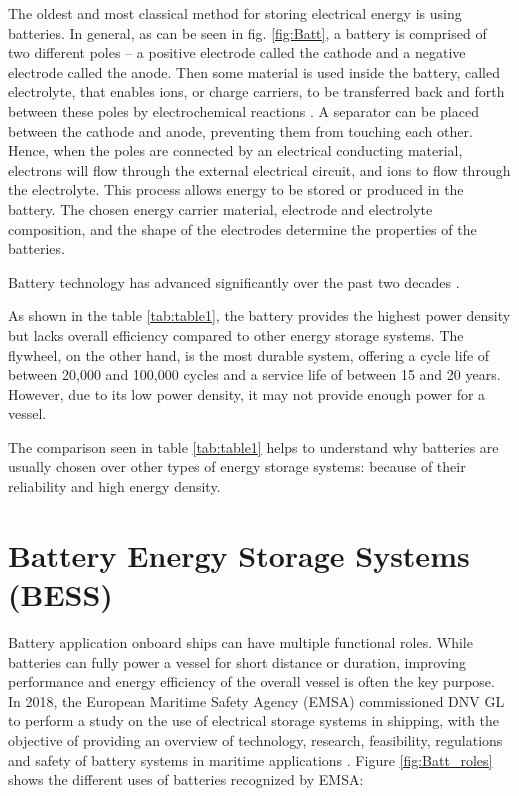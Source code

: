 The oldest and most classical method for storing electrical energy is using batteries. In general, as can be seen in fig. \ref{fig:Batt}, a battery is comprised of two different poles – a positive electrode called the cathode and a negative electrode called the anode. Then some material is used inside the battery, called electrolyte, that enables ions, or charge carriers, to be transferred back and forth between these poles by electrochemical reactions \cite{EMSA}. A separator can be placed between the cathode and anode, preventing them from touching each other. Hence, when the poles are connected by an electrical conducting material, electrons will flow through the external electrical circuit, and ions to flow through the electrolyte. This process allows energy to be stored or produced in the battery. The chosen energy carrier material, electrode and electrolyte composition, and the shape of the electrodes determine the properties of the batteries.

Battery technology has advanced significantly over the past two decades \cite{MAN}. 

As shown in the table \ref{tab:table1}, the battery provides the highest power density but lacks overall efficiency compared to other energy storage systems. The flywheel, on the other hand, is the most durable system, offering a cycle life of between 20,000 and 100,000 cycles and a service life of between 15 and 20 years. However, due to its low power density, it may not provide enough power for a vessel.

The comparison seen in table \ref{tab:table1} helps to understand why batteries are usually chosen over other types of energy storage systems: because of their reliability and high energy density.

\section{Battery Energy Storage Systems (BESS)} \label{sec:Roles}

Battery application onboard ships can have multiple functional roles. While batteries can fully power a vessel for short distance or duration, improving performance and energy efficiency of the overall vessel is often the key purpose.\\
In 2018, the European Maritime Safety Agency (EMSA) commissioned DNV GL to perform a study on the use of electrical storage systems in shipping, with the objective of providing an overview of technology, research, feasibility, regulations and safety of battery systems in maritime applications \cite{EMSA}. Figure \ref{fig:Batt_roles} shows the different uses of batteries recognized by EMSA:

